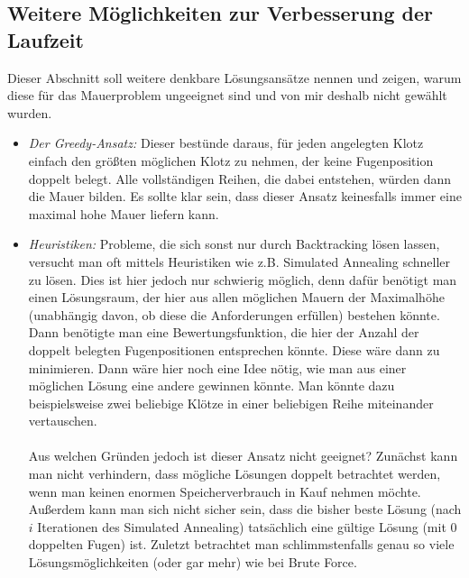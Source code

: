 \documentclass[a4paper, notitlepage, 12pt]{scrartcl}
\begin{document}
\subsection{Weitere Möglichkeiten zur Verbesserung der Laufzeit}
Dieser Abschnitt soll weitere denkbare Lösungsansätze nennen und zeigen, warum diese für das Mauerproblem ungeeignet sind und von mir deshalb nicht gewählt wurden.
\begin{itemize}
\item \textit{Der Greedy-Ansatz:} Dieser bestünde daraus, für jeden angelegten Klotz einfach den größten möglichen Klotz zu nehmen, der keine Fugenposition doppelt belegt. Alle vollständigen Reihen, die dabei entstehen, würden dann die Mauer bilden. Es sollte klar sein, dass dieser Ansatz keinesfalls immer eine maximal hohe Mauer liefern kann.
\item \textit{Heuristiken:} Probleme, die sich sonst nur durch Backtracking lösen lassen, versucht man oft mittels Heuristiken wie z.B. Simulated Annealing schneller zu lösen. Dies ist hier jedoch nur schwierig möglich, denn dafür benötigt man einen Lösungsraum, der hier aus allen möglichen Mauern der Maximalhöhe (unabhängig davon, ob diese die Anforderungen erfüllen) bestehen könnte. Dann benötigte man eine Bewertungsfunktion, die hier der Anzahl der doppelt belegten Fugenpositionen entsprechen könnte. Diese wäre dann zu minimieren. Dann wäre hier noch eine Idee nötig, wie man aus einer möglichen Lösung eine andere gewinnen könnte. Man könnte dazu beispielsweise zwei beliebige Klötze in einer beliebigen Reihe miteinander vertauschen. \\ \\
Aus welchen Gründen jedoch ist dieser Ansatz nicht geeignet? Zunächst kann man nicht verhindern, dass mögliche Lösungen doppelt betrachtet werden, wenn man keinen enormen Speicherverbrauch in Kauf nehmen möchte. Außerdem kann man sich nicht sicher sein, dass die bisher beste Lösung (nach $i$ Iterationen des Simulated Annealing) tatsächlich eine gültige Lösung (mit 0 doppelten Fugen) ist. Zuletzt betrachtet man schlimmstenfalls genau so viele Lösungsmöglichkeiten (oder gar mehr) wie bei Brute Force.

\end{itemize}
\end{document}
